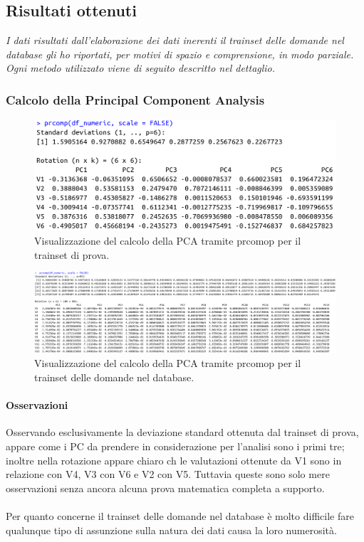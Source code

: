 \subsection{Risultati ottenuti}
\label{Risultati ottenuti}

\textit{I dati risultati dall'elaborazione dei dati inerenti il trainset delle domande nel database gli ho riportati, per motivi di spazio e comprensione, in modo parziale. Ogni metodo utilizzato viene di seguito descritto nel dettaglio.}

\subsubsection{Calcolo della Principal Component Analysis}
\label{Calcolo della Principal Component Analysis}
\begin{figure}[H]
\centering
	\includegraphics[width=0.80\linewidth]{../../PCA/plot/prcomp_rete-prova.png}
	\caption{Visualizzazione del calcolo della PCA tramite prcomop per il trainset di prova.}
\end{figure}

\begin{figure}[H]
\centering
	\includegraphics[width=1\linewidth]{../../PCA/plot/prcomp_rete-db.png}
	\caption{Visualizzazione del calcolo della PCA tramite prcomop per il trainset delle domande nel database.}
\end{figure}
\noindent

\paragraph{Osservazioni}
Osservando  esclusivamente la deviazione standard ottenuta dal trainset di prova, appare come i PC da prendere in considerazione per l'analisi sono i primi tre; inoltre  nella rotazione appare chiaro ch le valutazioni ottenute da V1 sono in relazione con V4, V3 con V6 e V2 con V5. Tuttavia queste sono solo mere osservazioni senza ancora alcuna prova matematica  completa a supporto. \\\\ Per quanto concerne il trainset delle domande nel database \`e molto difficile fare qualunque tipo di assunzione sulla natura dei dati causa la loro numerosit\`a.

